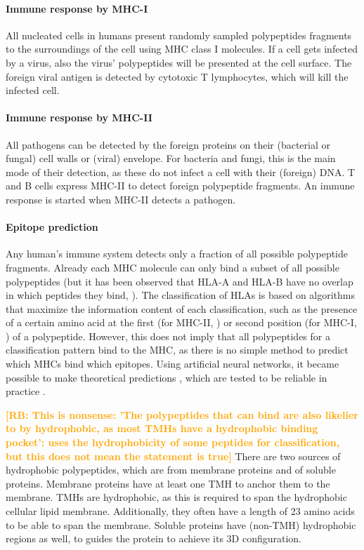 \documentclass{article}
\newcommand{\richel}[1]{\textcolor{orange}{\textbf{[RB: #1]}}}
\begin{document}
\paragraph{Immune response by MHC-I}

All nucleated cells in humans present randomly sampled polypeptides
fragments to the surroundings of the cell using MHC class I molecules.
If a cell gets infected by a virus, also the virus' polypeptides
will be presented at the cell surface. The foreign viral antigen is detected 
by cytotoxic T lymphocytes, which will kill the infected cell.

\paragraph{Immune response by MHC-II}

All pathogens can be detected by the foreign proteins on 
their (bacterial or fungal) cell walls or (viral) envelope.
For bacteria and fungi, this is the main mode of their detection,
as these do not infect a cell with their (foreign) DNA.
T and B cells express MHC-II to detect foreign polypeptide fragments.
An immune response is started when MHC-II detects a pathogen.

\paragraph{Epitope prediction}

Any human's immune system detects only a fraction of all possible
polypeptide fragments. 
Already each MHC molecule can only bind a
subset of all possible polypeptides (but it has been observed that HLA-A and HLA-B have no overlap in which
peptides they bind, \cite{lund2004definition}).
The classification of HLAs is based on algorithms that
maximize the information content of each 
classification, such as the presence of a certain amino acid at 
the first (for MHC-II, \cite{southwood1998several})
or second position (for MHC-I, \cite{lund2004definition}) of a polypeptide.
However, this does not imply that all polypeptides for a classification
pattern bind to the MHC, as there is no simple method to predict which 
MHCs bind which epitopes.
Using artificial neural networks, it became
possible to make theoretical predictions \cite{nielsen2003reliable,nielsen2004improved},
which are tested to be reliable in practice \cite{larsen2010identification,schellens2008unanticipated,tang2011genome}.




\richel{This is nonsense: 'The polypeptides that can bind are also 
likelier to by hydrophobic,
as most TMHs have a hydrophobic binding pocket': \cite{lund2004definition}
uses the hydrophobicity of some peptides for classification, but this
does not mean the statement is true}
There are two sources of hydrophobic polypeptides, which are 
from membrane proteins and of soluble proteins.
Membrane proteins have at least one TMH to anchor them to
the membrane. TMHs are hydrophobic, as this is required to span the 
hydrophobic cellular lipid membrane. Additionally,
they often have a length of 23 amino acids to be able to span
the membrane.
Soluble proteins have (non-TMH) hydrophobic regions as well, 
to guides the protein to achieve its 3D configuration.
\end{document}
